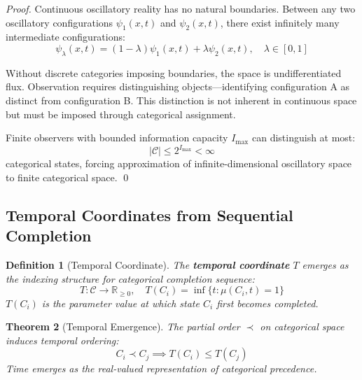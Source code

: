 \documentclass[11pt]{article}
\newtheorem{theorem}{Theorem}[section]
\newtheorem{definition}[theorem]{Definition}
\theoremstyle{remark}
\begin{document}
\begin{proof}
Continuous oscillatory reality has no natural boundaries. Between any two oscillatory configurations $\psi_1(x,t)$ and $\psi_2(x,t)$, there exist infinitely many intermediate configurations:
\begin{equation}
\psi_\lambda(x,t) = (1-\lambda)\psi_1(x,t) + \lambda\psi_2(x,t), \quad \lambda \in [0,1]
\end{equation}

Without discrete categories imposing boundaries, the space is undifferentiated flux. Observation requires distinguishing objects—identifying configuration A as distinct from configuration B. This distinction is not inherent in continuous space but must be imposed through categorical assignment.

Finite observers with bounded information capacity $I_{\text{max}}$ can distinguish at most:
\begin{equation}
|\mathcal{C}| \leq 2^{I_{\text{max}}} < \infty
\end{equation}
categorical states, forcing approximation of infinite-dimensional oscillatory space to finite categorical space. \qed
\end{proof}

\subsection{Temporal Coordinates from Sequential Completion}

\begin{definition}[Temporal Coordinate]
\label{def:temporal_coordinate}
The \textbf{temporal coordinate} $T$ emerges as the indexing structure for categorical completion sequence:
\begin{equation}
T: \mathcal{C} \to \mathbb{R}_{\geq 0}, \quad T(C_i) = \inf\{t : \mu(C_i, t) = 1\}
\end{equation}
$T(C_i)$ is the parameter value at which state $C_i$ first becomes completed.
\end{definition}

\begin{theorem}[Temporal Emergence]
\label{thm:temporal_emergence}
The partial order $\prec$ on categorical space induces temporal ordering:
\begin{equation}
C_i \prec C_j \implies T(C_i) \leq T(C_j)
\end{equation}
Time emerges as the real-valued representation of categorical precedence.
\end{theorem}
\end{document}
